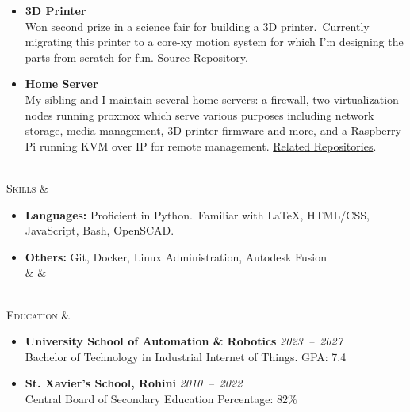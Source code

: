 \documentclass[11pt]{article}
\begin{document}
\begin{tblr}
\begin{itemize}[topsep=0pt,leftmargin=15pt]
            \item \textbf{3D Printer}\\
            Won second prize in a science fair for building a 3D printer.\ Currently migrating this printer to a core-xy
            motion system for which I'm designing the parts from scratch for fun.
            \href{https://github.com/xserv-labs/cad}{\color{blue}Source Repository}.

            \item \textbf{Home Server}\\
            My sibling and I maintain several home servers: a firewall, two virtualization nodes running proxmox which
            serve various purposes including network storage, media management, 3D printer firmware and more, and a
            Raspberry Pi running KVM over IP for remote management.
            \href{https://github.com/xserv-labs}{\color{blue}Related Repositories}.\
        \end{itemize}
        \\
        \textsc{\Large Skills} &
        \vspace*{-1.5\topsep}
        \begin{itemize}[topsep=0pt,leftmargin=15pt]
            \item \textbf{Languages:} Proficient in Python.\ Familiar with \LaTeX, HTML/CSS, JavaScript, Bash, OpenSCAD.
            \item \textbf{Others:} Git, Docker, Linux Administration, Autodesk Fusion \\ & &
        \end{itemize}
        \\
        \textsc{\Large Education} &
        \vspace*{-1.5\topsep}
        \begin{itemize}[topsep=0pt,leftmargin=15pt]
            \item \textbf{University School of Automation \& Robotics} \hfill \textit{2023~--~2027} \\
            Bachelor of Technology in Industrial Internet of Things. \hfill GPA: 7.4
            \item \textbf{St. Xavier's School, Rohini} \hfill \textit{2010~--~2022} \\
            Central Board of Secondary Education \hfill Percentage: $82\%$
        \end{itemize}
    \end{tblr}
\end{document}
